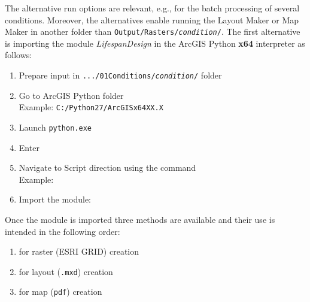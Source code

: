 The alternative run options are relevant, e.g., for the batch processing of several conditions. Moreover, the alternatives enable running the Layout Maker or Map Maker in another folder than \texttt{Output/Rasters/\textit{condition}/}. The first alternative is importing the module \textit{LifespanDesign} in the ArcGIS Python \textbf{x64} interpreter as follows:

\begin{enumerate}
	\item Prepare input in \texttt{.../01{\myUnderscore}Conditions/\textit{condition}/} folder
	\item Go to ArcGIS Python folder\\
	Example: \texttt{C:/Python27/ArcGISx64XX.X}
	\item Launch \texttt{python.exe}
	\item Enter 
	\item Navigate to Script direction using the command \\
	Example: 
	\item Import the module: \\
\end{enumerate}

Once the module is imported three methods are available and their use is intended in the following order:
\begin{enumerate}
	\item {} for raster (ESRI GRID) creation
	\item {} for layout (\texttt{.mxd}) creation
	\item {} for map (\texttt{pdf}) creation
\end{enumerate}

